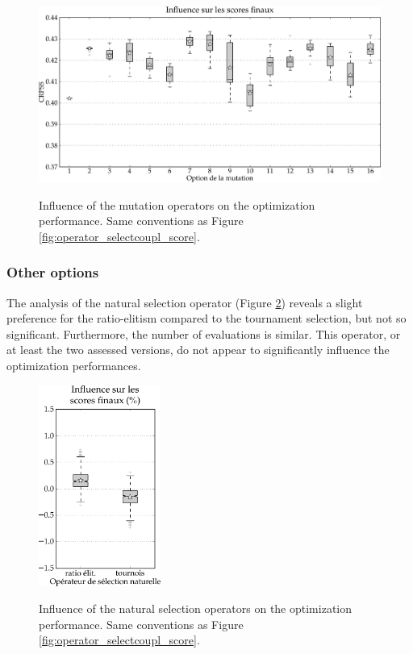 \documentclass[twocol]{ametsoc}
\begin{document}
\begin{figure}[htb]
	\begin{center}
		\noindent\includegraphics[width=14cm,angle=0]{figures/operator_mutation_score_r4.pdf}\\
	\end{center}
	\caption{Influence of the mutation operators on the optimization performance. Same conventions as Figure \ref{fig:operator_selectcoupl_score}.}
	\label{fig:operator_mutation_score_r4}
\end{figure}


\subsubsection{Other options}

The analysis of the natural selection operator (Figure \ref{fig:operator_selectnat_score}) reveals a slight preference for the ratio-elitism compared to the tournament selection, but not so significant. Furthermore, the number of evaluations is similar. This operator, or at least the two assessed versions, do not appear to significantly influence the optimization performances.

\begin{figure}[htb]
	\begin{center}
		\noindent\includegraphics[width=4cm,angle=0]{figures/operator_selectnat_score.pdf}\\
	\end{center}
	\caption{Influence of the natural selection operators on the optimization performance. Same conventions as Figure \ref{fig:operator_selectcoupl_score}.}
	\label{fig:operator_selectnat_score}
\end{figure}
\end{document}
